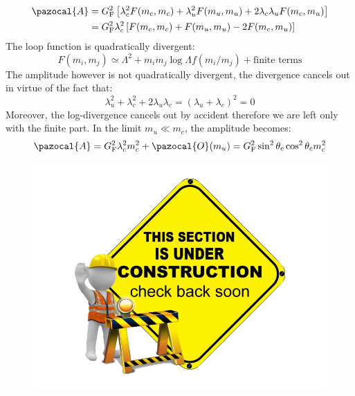 \documentclass[../main.tex]{subfiles}
\begin{document}
\begin{align*}
\pazocal{A}&=G_{\text{F}}^2\left[\lambda_c^2F(m_c,m_c)+\lambda_u^2F(m_u,m_u)+2\lambda_c\lambda_uF(m_c,m_u)\right]\\
&=G_{\text{F}}^2\lambda_c^2\left[F(m_c,m_c)+F(m_u,m_u)-2F(m_c,m_u)\right]
\end{align*}
The loop function is quadratically divergent:
\[
F(m_i,m_j)\simeq\Lambda^2+m_im_j\log\Lambda f(m_i/m_j)+\text{finite terms}
\]
The amplitude however is not quadratically divergent, the divergence cancels out in virtue of the fact that:
\[
\lambda_u^2+\lambda_c^2+2\lambda_u\lambda_c=(\lambda_u+\lambda_c)^2=0
\]
Moreover, the log-divergence cancels out by accident therefore we are left only with the finite part. In the limit $m_u\ll m_c$, the amplitude becomes:
\[
\pazocal{A}=G_{\text{F}}^2\lambda_c^2m_c^2+\pazocal{O}(m_u)=G_{\text{F}}^2\sin^2\theta_c\cos^2\theta_cm_c^2
\]
\begin{figure}[h]
    \centering
    \includegraphics{Images/workinprogress.png}
    \caption*{}
    \label{fig:my_label}
\end{figure}
\end{document}
